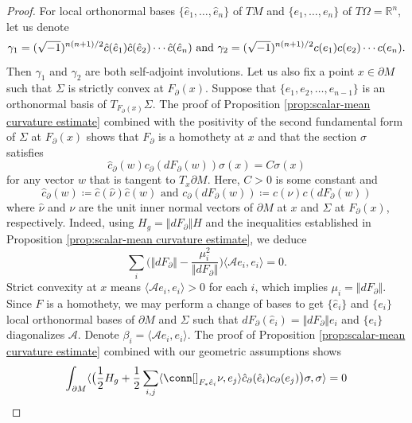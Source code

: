 \documentclass[12pt, reqno]{amsart}
\theoremstyle{plain} %
\theoremstyle{definition}
\theoremstyle{remark}
\numberwithin{equation}{section}
\newcommand{\dom}[1]{\hat{#1}}
\newcommand{\onorm}[1]{\Vert #1 \Vert}
\newcommand{\bnd}[1]{\partial #1}
\newcommand{\field}[1]{\mathbb{#1}}
\newcommand{\R}{\field{R}}
\newcommand{\inner}[1]{\langle #1 \rangle}
\begin{document}
\begin{proof}
    For local orthonormal bases $\{\hat e_1,\ldots,\hat e_n\}$ of $TM$ and $\{e_1,\ldots,e_n\}$ of $T\Omega=\R^n$, let us denote
    $$\gamma_1=(\sqrt{-1})^{n(n+1)/2} \hat c(\hat e_1)\hat c(\hat e_2)\cdots\hat c(\hat e_n)\textup{ and }\gamma_2=(\sqrt{-1})^{n(n+1)/2} c(e_1)c(e_2)\cdots c(e_n).$$
    Then $\gamma_1$ and $\gamma_2$ are both self-adjoint involutions. 
    Let us also fix a point $x\in \partial M$ such that $\Sigma$ is strictly convex at $F_\partial(x)$. Suppose that $\{e_1,e_2,\ldots,e_{n-1}\}$ is an orthonormal basis of $T_{F_\partial(x)}\Sigma$. The proof of Proposition \ref{prop:scalar-mean curvature estimate} combined with the positivity of the second fundamental form of $\Sigma$ at $F_\partial(x)$ shows that $F_\partial$ is a homothety at \(x\) and that the section $\sigma$ satisfies
    $$\hat c_\partial(w) c_\partial(dF_\partial(w))\sigma(x) =C\sigma(x)$$
    for any vector $w$ that is tangent to $T_x\partial M$. 
    Here, \(C > 0\) is some constant and
    \begin{equation*}
        \dom{c}_\partial(w) \coloneqq \dom{c}(\dom{\nu}) \dom{c}(w) \text{ and } c_\partial(dF_\partial(w)) \coloneqq c(\nu) c(dF_\partial(w))
    \end{equation*}
    where \(\dom{\nu}\) and \(\nu\) are the unit inner normal vectors of $\partial M$ at $x$ and $\Sigma$ at $F_\partial(x)$, respectively.
    Indeed, using \(H_g = \onorm{dF_\partial} H\) and the inequalities established in Proposition \ref{prop:scalar-mean curvature estimate}, we deduce
    \begin{equation*}
        \sum_i \Big(\onorm{dF_\partial} - \frac{\mu_i^2}{\onorm{dF_\partial}}\Big) \inner{\mathcal{A}e_i, e_i} = 0.
    \end{equation*}
    Strict convexity at \(x\) means \(\inner{\mathcal{A}e_i, e_i} > 0\) for each \(i\), which implies \(\mu_i = \onorm{dF_\partial}\).
    Since \(F\) is a homothety, we may perform a change of bases to get \(\{\dom{e}_i\}\) and \(\{e_i\}\) local orthonormal bases of \(\bnd{M}\) and \(\Sigma\) such that \(dF_\partial (\dom{e}_i) = \onorm{dF_\partial} e_i\) and \(\{e_i\}\) diagonalizes \(\mathcal{A}\).
    Denote \(\beta_i = \inner{\mathcal{A} e_i, e_i}\).
    The proof of Proposition \ref{prop:scalar-mean curvature estimate} combined with our geometric assumptions shows
    \begin{equation*}
        \int_{\bnd{M}} \inner{\big(\frac{1}{2} H_g + \frac{1}{2} \sum_{i,j} \inner{\conn[]_{F_*\dom{e}_i} \nu, e_j} \dom{c}_\partial(\dom{e}_i) c_\partial(e_j)\big) \sigma, \sigma} = 0

\end{equation*}
\end{proof}
\end{document}
